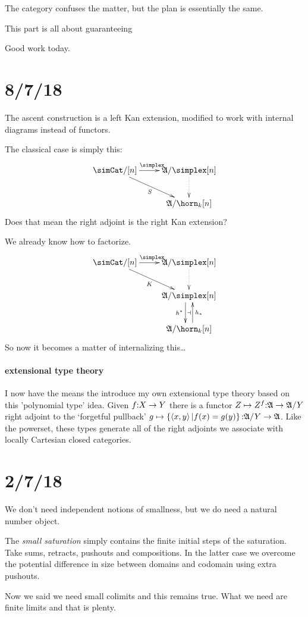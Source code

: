\documentclass[csh.tex]{subfiles}
\begin{document}
The category confuses the matter,
but the plan is essentially the same.

This part is all about guaranteeing 

Good work today.

\section{8/7/18}
The ascent construction is a left Kan extension, modified to work with internal diagrams instead of functors.

The classical case is simply this:
\[\xymatrix{
\simCat/[n] \ar[r]^\simplex\ar[dr]_{S} & \ambient/\simplex[n]\ar@{.>}[d] \\
& \ambient/\horn_k[n]
}\]
Does that mean the right adjoint is the right Kan extension?

We already know how to factorize.
\[\xymatrix{
\simCat/[n] \ar[r]^\simplex\ar[dr]_{K} & \ambient/\simplex[n]\ar@{.>}[d] \\
& \ambient/\simplex[n] \ar@<-1ex>[d]_{h\ri}\ar@{}[d]|\dashv\\
& \ambient/\horn_k[n] \ar@<-1ex>[u]_{h_*}
}\]
So now it becomes a matter of internalizing this\dots

\paragraph{extensional type theory}
I now have the means the introduce my own extensional type theory based on this 'polynomial type' idea. Given $f\mathord : X\to Y$ there is a functor $Z\mapsto Z^f\mathord : \mathfrak A\to \mathfrak A/Y$ right adjoint to the `forgetful pullback' $g \mapsto\left\{\left\langle x,y \right\rangle|f(x)=g(y)\right\} \mathord :\mathfrak A/Y\to \mathfrak A$. Like the powerset, these types generate all of the right adjoints we associate with locally Cartesian closed categories.

\section{2/7/18}
We don't need independent notions of smallness, but we do need a natural number object.

The \emph{small saturation} simply contains the finite initial steps of the saturation. Take sums, retracts, pushouts and compositions. In the latter case we overcome the potential difference in size between domains and codomain using extra pushouts.

Now we said we need small colimits and this remains true. What we need are finite limits and that is plenty.
\end{document}

